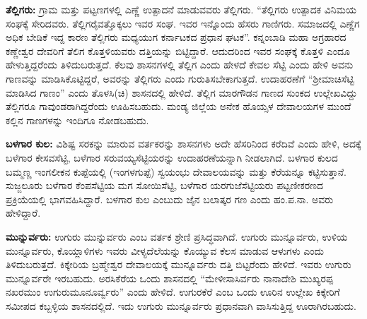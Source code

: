 \textbf{ತೆಲ್ಲಿಗರು:} ಗ್ರಾಮ ಮತ್ತು ಪಟ್ಟಣಗಳಲ್ಲಿ ಎಣ್ಣೆ ಉತ್ಪಾದನೆ ಮಾಡುವವರು ತೆಲ್ಲಿಗರು. “ತೆಲ್ಲಿಗರು ಉತ್ಪಾದಕ ವಿನಿಮಯ ಸಂಘಕ್ಕೆ ಸೇರಿದವರು. ತೆಲ್ಲಿಗರೈವತ್ತೊಕ್ಕಲು ಇವರ ಸಂಘ. ಇವರ ಇನ್ನೊಂದು ಹೆಸರು ಗಾಣಿಗರು. ಸಮಾಜದಲ್ಲಿ ಎಣ್ಣೆಗ ಅಧಿಕ ಬೇಡಿಕೆ ಇದ್ದ ಕಾರಣ ತೆಲ್ಲಿಗರು ಮಧ್ಯಯುಗ ಕರ್ನಾಟಕದ ಪ್ರಧಾನ ಘಟಕ”. ಕನ್ನಂಬಾಡಿ ಮಹಾ ಅಗ್ರಹಾರದ ಕಣ್ಣೇಶ್ವರ ದೇವರಿಗೆ ತೆಲಿಗ ಕೊತ್ತಳಿಯವರು ದತ್ತಿಯನ್ನು ಬಿಟ್ಟಿದ್ದಾರೆ. ಆದುದರಿಂದ ಇವರ ಸಂಘಕ್ಕೆ ಕೊತ್ತಳಿ ಎಂದೂ ಹೇಳುತ್ತಿದ್ದರೆಂದು ತಿಳಿದುಬರುತ್ತದೆ. ಕೆಲವು ಶಾಸನಗಳಲ್ಲಿ ತೆಲ್ಲಿಗ ಎಂದು ಹೇಳದೆ ಕೇವಲ ಸೆಟ್ಟಿ ಎಂದು ಹೇಳಿ ಅವನು ಗಾಣವನ್ನು ಮಾಡಿಸಿಕೊಟ್ಟಿದ್ದರೆ, ಅವರನ್ನು ತೆಲ್ಲಿಗರು ಎಂದು ಗುರುತಿಸಬೇಕಾಗುತ್ತದೆ. ಉದಾಹರಣೆಗೆ “ಶ‍್ರೀಮಾಚಿಸೆಟ್ಟಿ ಮಾಡಿಸಿದ ಗಾಣಂ” ಎಂದು ತೊಳಸಿ(ಚಿ) ಶಾಸನದಲ್ಲಿ ಹೇಳಿದೆ. ತೆಲ್ಲಿಗ ಮಾರಗೌಡನ ಗಾಣದ ಸುಂಕದ ಉಲ್ಲೇಖವಿದ್ದು ತೆಲ್ಲಿಗರೂ ಗಾವುಂಡರಾಗಿದ್ದರೆಂದು ಊಹಿಸಬಹುದು. ಮಂಡ್ಯ ಜಿಲ್ಲೆಯ ಅನೇಕ ಹೊಯ್ಸಳ ದೇವಾಲಯಗಳ ಮುಂದೆ ಕಲ್ಲಿನ ಗಾಣಗಳನ್ನು ಇಂದಿಗೂ ನೋಡಬಹುದು.

\textbf{ಬಳಗಾರ ಕುಲ:} ವಿಶಿಷ್ಟ ಸರಕನ್ನು ಮಾರುವ ವರ್ತಕರನ್ನು ಶಾಸನಗಳು ಅದೇ ಹೆಸರಿನಿಂದ ಕರೆದಿವೆ ಎಂದು ಹೇಳಿ, ಅದಕ್ಕೆ ಬಳೆಗಾರ ಕೇಸವಸೆಟ್ಟಿ, ಬಳೆಗಾರ ಸರುವಯ್ಯಸೆಟ್ಟಿಯರನ್ನು ಉದಾಹರಣೆಯನ್ನಾಗಿ ನೀಡಲಾಗಿದೆ. ಬಳಗಾರ ಕುಲದ ಬಮ್ಮಣ್ಣ ಇಂಗಲೀಕನ ಕುಪ್ಪೆಯಲ್ಲಿ (ಇಂಗಳಗುಪ್ಪೆ) ಸ್ವಯಂಭು ದೇವಾಲಯವನ್ನು ಮತ್ತು ಕೆರೆಯನ್ನೂ ಕಟ್ಟಿಸುತ್ತಾನೆ. ಸುಜ್ಜಲೂರು ಬಳೆಗಾರ ಕೆಂಪಸೆಟ್ಟಿಯ ಮಗ ಸೋಯಿಸೆಟ್ಟಿ, ಬಳೆಗಾರ ಯರಗುಜೆಸೆಟ್ಟಿಯರು ಪಟ್ಟಣೀಕರಣದ ಪ್ರಕ್ರಿಯೆಯಲ್ಲಿ ಭಾಗವಹಿಸಿದ್ದಾರೆ. ಬಳಗಾರ ಕುಲ ಎಂಬುದು ಜೈನ ಬಲಾತ್ಕರ ಗಣ ಎಂದು ಹಂ.ಪ.ನಾ. ಅವರು ಹೇಳಿದ್ದಾರೆ.

\textbf{ಮುನ್ನುರ್ವರು: } ಉಗುರು ಮುನ್ನುರ್ವರು ಎಂಬ ವರ್ತಕ ಶ್ರೇಣಿ ಪ್ರಸಿದ್ಧವಾಗಿದೆ. ಉಗುರು ಮುನ್ನೂರ್ವರು, ಉಳಿಯ ಮುನ್ನೂರ್ವರು, ಕೊಯ್ಲಾಳಿಗಳು ಇವರು ವೀಳ್ಯದೆಲೆಯನ್ನು ಕೊಯ್ಯುವ ಕೆಲಸ ಮಾಡುವ ಆಳುಗಳು ಎಂದು ತಿಳಿದುಬರುತ್ತದೆ. ಕಿಕ್ಕೇರಿಯ ಬ್ರಹ್ಮೇಶ್ವರ ದೇವಾಲಯಕ್ಕೆ ಮುನ್ನೂರ್ವರು ದತ್ತಿ ಬಿಟ್ಟರೆಂದು ಹೇಳಿದೆ. ಇವರು ಉಗುರು ಮುನ್ನೂರ್ವರೇ ಇರಬಹುದು. ಅರಸಿಕೆರೆಯ ಒಂದು ಶಾಸನದಲ್ಲಿ “ಮೇಳೀಸಾಸಿರ್ವರು ನಾನಾದೇಶಿ ಮುಖ್ಯರಪ್ಪ ನಖರಮುಂ ಉಗುರುಮೂನೂರ್ವ್ವರು” ಎಂದು ಹೇಳಿದೆ. ಉಗುರಕೆರೆ ಎಂಬ ಒಂದು ಊರಿನ ಉಲ್ಲೇಖ ಕಿಕ್ಕೇರಿಗೆ ಸಮೀಪದ ಕಬ್ಬಳ್ಳಿಯ ಶಾಸನದಲ್ಲಿದೆ. ಇದು ಉಗುರು ಮುನ್ನೂರ್ವರು ಪ್ರಧಾನವಾಗಿ ವಾಸಿಸುತ್ತಿದ್ದ ಊರಾಗಿರಬಹುದು.

